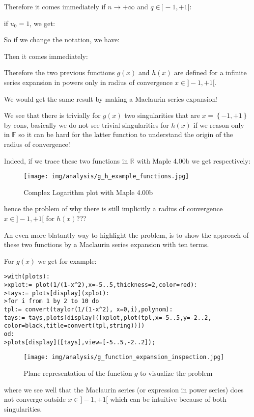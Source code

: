 	Therefore it comes immediately if $n \rightarrow +\infty$ and $q \in ]-1,+1[$:
	
	if $u_0=1$, we get:
	
	So if we change the notation, we have:
	
	Then it comes immediately:
	
	Therefore the two previous functions $g(x)$ and $h(x)$ are defined for a infinite series expansion in powers only in radius of convergence $x \in ]-1,+1[$.
	
	We would get the same result by making a Maclaurin series expansion!
	
	We see that there is trivially for $g(x)$ two singularities that are $x=\left\lbrace -1,+1\right\rbrace$ by cons, basically we do not see trivial singularities for $h (x)$ if we reason only in $\mathbb{F}$ so it can be hard for the latter function to understand the origin of the radius of convergence!
	
	Indeed, if we trace these two functions in $\mathbb{R}$ with Maple 4.00b we get respectively:
	\begin{figure}[H]
		\begin{center}
			\texttt{[image: img/analysis/g\_h\_example\_functions.jpg]}
		\end{center}	
		\caption{Complex Logarithm plot with Maple 4.00b}
	\end{figure}
	hence the problem of why there is still implicitly a radius of convergence $x \in ]-1,+1[$ for $h (x)$???
	
	An even more blatantly way to highlight the problem, is to show the approach of these two functions by a Maclaurin series expansion with ten terms.
	
	For $g(x)$ we get for example:
	
	\texttt{>with(plots):\\
	>xplot:= plot(1/(1-x\string^2),x=-5..5,thickness=2,color=red):\\
	>tays:= plots[display](xplot):\\
	>for i from 1 by 2 to 10 do\\
		tpl:= convert(taylor(1/(1-x\string^2), x=0,i),polynom):\\
		tays:= tays,plots[display]([xplot,plot(tpl,x=-5..5,y=-2..2,\\
		color=black,title=convert(tpl,string))])\\
		od:\\
	>plots[display]([tays],view=[-5..5,-2..2]);}
	
	\begin{figure}[H]
		\begin{center}
			\texttt{[image: img/analysis/g\_function\_expansion\_inspection.jpg]}
		\end{center}	
		\caption{Plane representation of the function $g$ to visualize the problem}
	\end{figure}
	where we see well that the Maclaurin series (or expression in power series) does not converge outside $x \in ]-1,+1[$  which can be intuitive because of both singularities.
	
